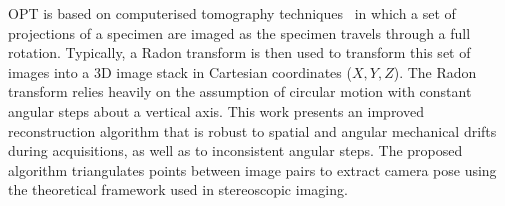 \documentclass[times, twoside, watermark]{zHenriquesLab-StyleBioRxiv}
\begin{document}

\gls*{OPT} is based on computerised tomography techniques~\cite{kakPrinciplesComputerizedTomographic2001} in which a set of projections of a specimen are imaged as the specimen travels through a full rotation.
Typically, a Radon transform is then used to transform this set of images into a 3D image stack in Cartesian coordinates (\(X,Y,Z\)).
The \gls*{Radon transform} relies heavily on the assumption of circular motion with constant angular steps about a vertical axis.
This work presents an improved reconstruction algorithm that is robust to spatial and angular mechanical drifts during acquisitions, as well as to inconsistent angular steps.
The proposed algorithm triangulates points between image pairs to extract camera pose using the theoretical framework used in stereoscopic imaging. %

%
\end{document}
